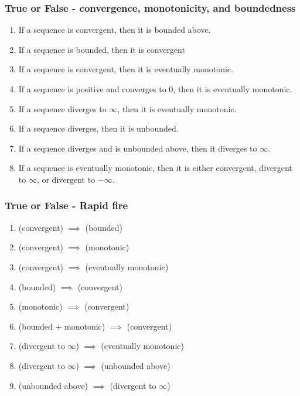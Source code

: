 \documentclass[14pt]{beamer}
\newcommand {\DS} [1] {${\displaystyle #1}$}
\newcommand{\setsize}[1]{\fontsize{#1}{#1}\selectfont} %
\newcommand{\smallerfont}{\setsize{13}} %
\begin{document}
\begin{frame}[t]
\smallerfont
\frametitle{\smallerfont True or False - convergence, monotonicity, and boundedness}

\begin{enumerate}
	\item  If a sequence is convergent, then it is bounded above.
	\item If a sequence is bounded, then it is convergent
	\item If a sequence is convergent, then it is eventually monotonic.
	\item If a sequence is positive and converges to 0, then it is eventually monotonic.
	\item If a sequence diverges to $\infty$, then it is eventually monotonic.
	\item If a sequence diverges, then it is unbounded.
	\item If a sequence diverges and is unbounded above, then it diverges to $\infty$.
	\item If a sequence is eventually monotonic, then it is either convergent, divergent to $\infty$, or divergent to $-\infty$.
\end{enumerate}

\end{frame}
\begin{frame}[t]
\frametitle{True or False - Rapid fire}

	\begin{enumerate}
		\item  (convergent) \DS{\implies} (bounded)
	\vfill
		\item  (convergent) \DS{\implies} (monotonic)
	\vfill
		\item  (convergent) \DS{\implies} (eventually monotonic)
	\vfill
		\item  (bounded) \DS{\implies} (convergent)
	\vfill
		\item  (monotonic) \DS{\implies} (convergent)
	\vfill
		\item  (bounded + monotonic) \DS{\implies} (convergent)
	\vfill
		\item  (divergent to $\infty$) \DS{\implies} (eventually monotonic)
	\vfill
		\item  (divergent to $\infty$) \DS{\implies} (unbounded above)
	\vfill
		\item  (unbounded above) \DS{\implies} (divergent to $\infty$)
	\end{enumerate}
\vfill

\vfill
\end{frame}
\end{document}
